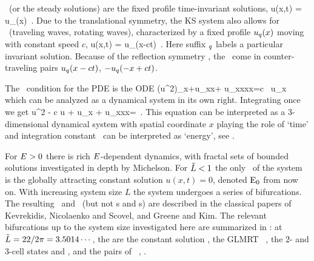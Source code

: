 
\Eqva\  (or the steady solutions)
are the fixed profile time-invariant solutions,
\beq
 u(x,t) = u_\stagn(x) %
\,.
Due to the translational symmetry,
the KS system also allows for
\reqva\ (traveling waves, rotating waves),
characterized by a fixed profile $u_\stagn(x)$
moving with constant speed $c$, {\ie}
\beq
 u(x,t) =  u_\stagn(x-ct) %
\,.
Here suffix ${}_\stagn$ labels a particular invariant solution.
Because of the reflection symmetry ,
the \reqva\ come in counter-traveling pairs
$u_\stagn(x-ct)$, $-u_\stagn(-x+ct)$.

The \reqv\ condition for the {\KS} PDE 
is the ODE
\beq
{\textstyle{}}(u^2)_x+u_{xx}+ u_{xxxx}=c \, u_x
which can be analyzed as a dynamical system in its own right.
Integrating once we get
\beq
{\textstyle{}}u^2 - c u + u_x + u_{xxx}=\expctE
\,.
\label{eq:stdks}
\eeq
This equation can be interpreted as a 3-dimen\-si\-on\-al dynamical system
with spatial coordinate $x$ playing the role of `time' and integration constant \expctE\ can be interpreted as `energy',
see .

For $E>0$ there is rich
$E$-dependent dynamics, with
fractal sets of bounded solutions investigated in
depth by Michelson.
%
%
For $\tilde{L}<1$ the only \eqv\ of the system is the
globally attracting constant
solution $u(x,t)=0$, denoted $\mathrm{E}_{0}$ from now on. With increasing system size $L$ the system
undergoes a series of bifurcations.
The resulting \eqva\ and
\reqva\ (but not \po s and \rpo s)
are described in the classical papers of
Kevrekidis, Nicolaenko and Scovel,
and Greene and Kim.
The relevant bifurcations
up to the system size
investigated here are summarized
in :
at $\tilde{L}=22/2\pi =
3.5014\cdots$, the {\eqva} are the constant solution
, the GLMRT \eqv\ , the $2$-
and $3$-cell states  and ,
and the pairs of \reqva\ , .

